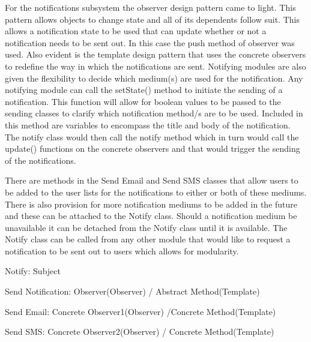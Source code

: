 \documentclass{article}
\begin{document}
    
    \begin{flushleft}
    
        For the notifications subsystem the observer design pattern came to light. This pattern allows objects to change state and all of its dependents follow suit. This allows a notification state to be used that can update whether or not a notification needs to be sent out. In this case the push method of observer was used. Also evident is the template design pattern that uses the concrete observers to redefine the way in which the notifications are sent. Notifying modules are also given the flexibility to decide which medium(s) are used for the notification. Any notifying module can call the setState() method to initiate the sending of a notification. This function will allow for boolean values to be passed to the sending classes to clarify which notification method/s are to be used. Included in this method are variables to encompass the title and body of the notification. The notify class would then call the notify method which in turn would call the update() functions on the concrete observers and that would trigger the sending of the notifications.  
        
        \bigskip

        
        There are methods in the Send Email and Send SMS classes that allow users to be added to the user lists for the notifications to either or both of these mediums. There is also provision for more notification mediums to be added in the future and these can be attached to the Notify class. Should a notification medium be unavailable it can be detached from the Notify class until it is available. The Notify class can be called from any other module that would like to request a notification to be sent out to users which allows for modularity.
        
        
        \clearpage

        Notify: Subject
        

        Send Notification: Observer(Observer) / Abstract Method(Template)
        

        Send Email: Concrete Observer1(Observer) /Concrete Method(Template)
        

        Send SMS: Concrete Observer2(Observer) / Concrete Method(Template)
    
    \end{flushleft}
    
    \mbox{}\\
    \bigskip
  
\end{document}
